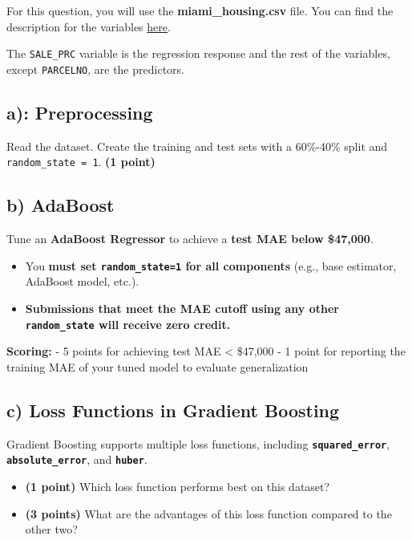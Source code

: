 \documentclass[
  letterpaper,
  DIV=11,
  numbers=noendperiod]{scrreprt}
\providecommand{\tightlist}{%
  \setlength{\itemsep}{0pt}\setlength{\parskip}{0pt}}\usepackage{longtable,booktabs,array}
\begin{document}
For this question, you will use the \textbf{miami\_housing.csv} file.
You can find the description for the variables
\href{https://www.kaggle.com/datasets/deepcontractor/miami-housing-dataset}{here}.

The \texttt{SALE\_PRC} variable is the regression response and the rest
of the variables, except \texttt{PARCELNO}, are the predictors.

\subsection{a): Preprocessing}\label{a-preprocessing}

Read the dataset. Create the training and test sets with a 60\%-40\%
split and \texttt{random\_state\ =\ 1}. \textbf{(1 point)}

\subsection{b) AdaBoost}\label{b-adaboost}

Tune an \textbf{AdaBoost Regressor} to achieve a \textbf{test MAE below
\$47,000}.

\begin{itemize}
\tightlist
\item
  You \textbf{must set \texttt{random\_state=1} for all components}
  (e.g., base estimator, AdaBoost model, etc.).
\item
  \textbf{Submissions that meet the MAE cutoff using any other
  \texttt{random\_state} will receive zero credit.}
\end{itemize}

\textbf{Scoring:} - 5 points for achieving test MAE \textless{} \$47,000
- 1 point for reporting the training MAE of your tuned model to evaluate
generalization

\subsection{c) Loss Functions in Gradient
Boosting}\label{c-loss-functions-in-gradient-boosting}

Gradient Boosting supports multiple loss functions, including
\textbf{\texttt{squared\_error}}, \textbf{\texttt{absolute\_error}}, and
\textbf{\texttt{huber}}.

\begin{itemize}
\tightlist
\item
  \textbf{(1 point)} Which loss function performs best on this dataset?
\item
  \textbf{(3 points)} What are the advantages of this loss function
  compared to the other two?
\end{itemize}
\end{document}
